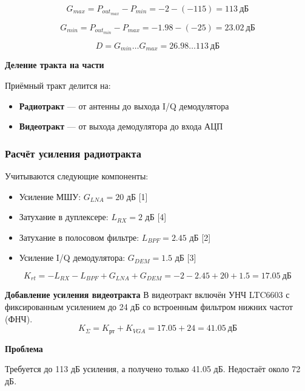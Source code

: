 \documentclass[a4paper,12pt]{article}
\begin{document}
\begin{equation}
G_{max} = P_{out_{max}} - P_{min} = -2 - (-115) = 113\ \text{дБ}
\end{equation}

\begin{equation}
G_{min} = P_{out_{min}} - P_{max} = -1.98 - (-25) = 23.02\ \text{дБ}
\end{equation}

\begin{equation}
D = G_{min} \ldots G_{max} = 26.98 \ldots 113\ \text{дБ}
\end{equation}

\textbf{Деление тракта на части}

Приёмный тракт делится на:
\begin{itemize}
\item \textbf{Радиотракт} — от антенны до выхода I/Q демодулятора
\item \textbf{Видеотракт} — от выхода демодулятора до входа АЦП
\end{itemize}

\subsubsection{Расчёт усиления радиотракта}

Учитываются следующие компоненты:
\begin{itemize}
\item Усиление МШУ: $G_{LNA} = 20$ дБ [1]
\item Затухание в дуплексере: $L_{RX} = 2$ дБ [4]
\item Затухание в полосовом фильтре: $L_{BPF} = 2.45$ дБ [2]
\item Усиление I/Q демодулятора: $G_{DEM} = 1.5$ дБ [3]
\end{itemize}

\begin{equation}
K_{rt} = -L_{RX} - L_{BPF} + G_{LNA} + G_{DEM} = -2 - 2.45 + 20 + 1.5 = 17.05\ \text{дБ}
\end{equation}

\textbf{Добавление усиления видеотракта} 
В видеотракт включён УНЧ LTC6603 с фиксированным усилением до 24 дБ со встроенным фильтром нижних частот (ФНЧ).
\begin{equation}
K_\Sigma = K_{рт} + K_{VGA} = 17.05 + 24 = 41.05\ \text{дБ}
\end{equation}
 

\textbf{Проблема}

Требуется до 113 дБ усиления, а получено только 41.05 дБ. Недостаёт около 72 дБ.
\end{document}
